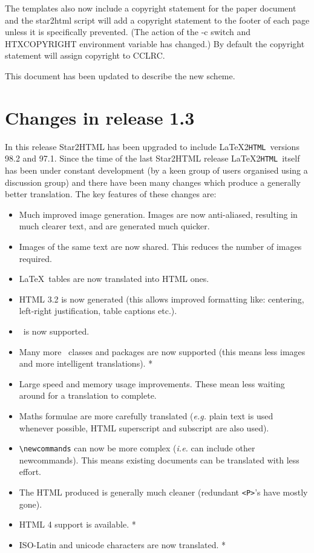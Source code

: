 \documentclass[twoside,11pt]{article}
\newcommand{\xlabel}[1]{}
\newcommand{\latextohtml}{\LaTeX2\texttt{HTML}}
\renewcommand{\_}{\texttt{\symbol{95}}}
\begin{document}
The templates also now include a copyright statement for the paper document
and the star2html script will add a copyright statement to the footer of each
page unless it is specifically prevented. (The action of the -c switch and 
HTX\_COPYRIGHT environment variable has changed.) By default the copyright 
statement will assign copyright to CCLRC.

This document has been updated to describe the new scheme.

\section{\xlabel{changes13}\label{changes13}Changes in release 1.3}
In this release Star2HTML has been upgraded to include \latextohtml\
versions 98.2 and 97.1. Since the time of the last Star2HTML release
\latextohtml\ itself has been under constant development (by a keen
group of users organised using a discussion group) and there have been
many changes which produce a generally better translation. The key
features of these changes are:
\begin{itemize}
\item Much improved image generation. Images are now anti-aliased,
      resulting in much clearer text, and are generated much quicker.
\item Images of the same text are now shared. This reduces the number
      of images required.
\item \LaTeX\ tables are now translated into HTML ones.
\item HTML 3.2 is now generated (this allows improved formatting like:
      centering, left-right justification, table captions etc.).
\item \LaTeXe\ is now supported.
\item Many more \LaTeXe\ classes and packages are now supported (this
      means less images and more intelligent translations). *
\item Large speed and memory usage improvements. These mean
      less waiting around for a translation to complete.
\item Maths formulae are more carefully translated (\textit{e.g.}
      plain text is used whenever possible, HTML superscript and
      subscript are also used).
\item \verb#\newcommands# can now be more complex (\textit{i.e.} can
      include other newcommands). This means existing documents can be
      translated with less effort.
\item The HTML produced is generally much cleaner (redundant \verb#<P>#'s
      have mostly gone).
\item HTML 4 support is available. *
\item ISO-Latin and unicode characters are now translated. *
\end{itemize}
\end{document}
